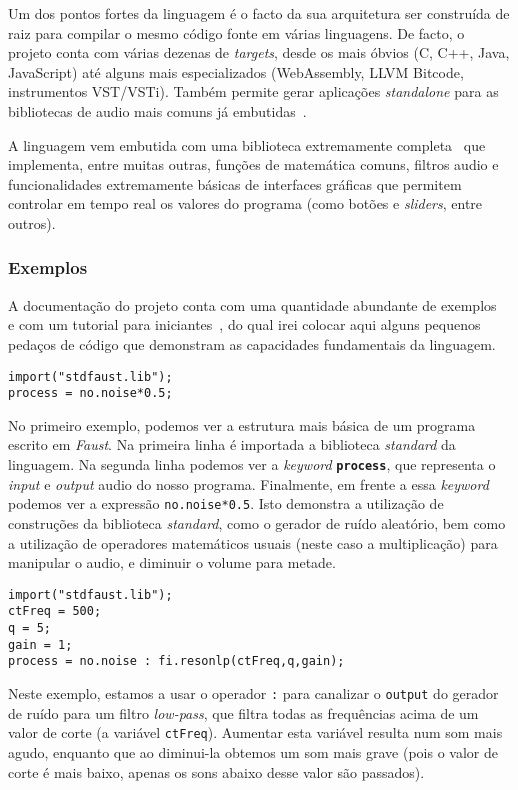 Um dos pontos fortes da linguagem é o facto da sua arquitetura ser construída de raiz para compilar o mesmo código fonte em várias linguagens. De facto, o projeto conta com várias dezenas de \textit{targets}, desde os mais óbvios (C, C++, Java, JavaScript) até alguns mais especializados (WebAssembly, LLVM Bitcode, instrumentos VST/VSTi). Também permite gerar aplicações \textit{standalone} para as bibliotecas de audio mais comuns já embutidas~\cite{faust-targets}.
	
A linguagem vem embutida com uma biblioteca extremamente completa~\cite{faust-libraries} que implementa, entre muitas outras, funções de matemática comuns, filtros audio e funcionalidades extremamente básicas de interfaces gráficas que permitem controlar em tempo real os valores do programa (como botões e \textit{sliders}, entre outros).
	
\subsubsection{Exemplos}
A documentação do projeto conta com uma quantidade abundante de exemplos~\cite{faust-examples} e com um tutorial para iniciantes~\cite{faust-quickstart}, do qual irei colocar aqui alguns pequenos pedaços de código que demonstram as capacidades fundamentais da linguagem.

\begin{lstlisting}[caption={Geração de ruído aleatório com volume a metade},captionpos=b]
import("stdfaust.lib");
process = no.noise*0.5;
\end{lstlisting}

No primeiro exemplo, podemos ver a estrutura mais básica de um programa escrito em \textit{Faust}. Na primeira linha é importada a biblioteca \textit{standard} da linguagem. Na segunda linha podemos ver a \textit{keyword} \textbf{\texttt{process}}, que representa o \textit{input} e \textit{output} audio do nosso programa. Finalmente, em frente a essa \textit{keyword} podemos ver a expressão \texttt{no.noise*0.5}. Isto demonstra a utilização de construções da biblioteca \textit{standard}, como o gerador de ruído aleatório, bem como a utilização de operadores matemáticos usuais (neste caso a multiplicação) para manipular o audio, e diminuir o volume para metade.

\begin{lstlisting}[caption={Geração de ruído aleatório com um filtro \textit{low-pass}}]
import("stdfaust.lib");
ctFreq = 500;
q = 5;
gain = 1;
process = no.noise : fi.resonlp(ctFreq,q,gain);
\end{lstlisting}
Neste exemplo, estamos a usar o operador \texttt{:} para canalizar o \texttt{output} do gerador de ruído para um filtro \textit{low-pass}, que filtra todas as frequências acima de um valor de corte (a variável \texttt{ctFreq}). Aumentar esta variável resulta num som mais agudo, enquanto que ao diminui-la obtemos um som mais grave (pois o valor de corte é mais baixo, apenas os sons abaixo desse valor são passados).


